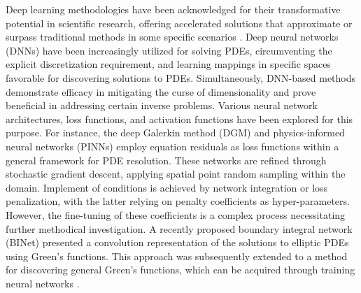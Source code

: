 \documentclass{article}
\begin{document}

Deep learning methodologies have been acknowledged for their transformative potential in scientific research, offering accelerated solutions that approximate or surpass traditional methods in some specific scenarios \cite{Jiang2020a, Raissi2019, Greenfeld2019, Kochkov2021a}. Deep neural networks (DNNs) have been increasingly utilized for solving PDEs, circumventing the explicit discretization requirement, and learning mappings in specific spaces favorable for discovering solutions to PDEs. Simultaneously, DNN-based methods demonstrate efficacy in mitigating the curse of dimensionality and prove beneficial in addressing certain inverse problems. Various neural network architectures, loss functions, and activation functions have been explored for this purpose. For instance, the deep Galerkin method (DGM) \cite{sirignano2018dgm} and physics-informed neural networks (PINNs) \cite{raissi2019physics} employ equation residuals as loss functions within a general framework for PDE resolution. These networks are refined through stochastic gradient descent, applying spatial point random sampling within the domain. Implement of conditions is achieved by network integration \cite{berg2018unified} or loss penalization, with the latter relying on penalty coefficients as hyper-parameters. However, the fine-tuning of these coefficients is a complex process necessitating further methodical investigation. A recently proposed boundary integral network (BINet) \cite{CSIAM-AM-4-275} presented a convolution representation of the solutions to elliptic PDEs using Green's functions. This approach was subsequently extended to a method for discovering general Green's functions, which can be acquired through training neural networks \cite{lin2023bi}.
\end{document}
